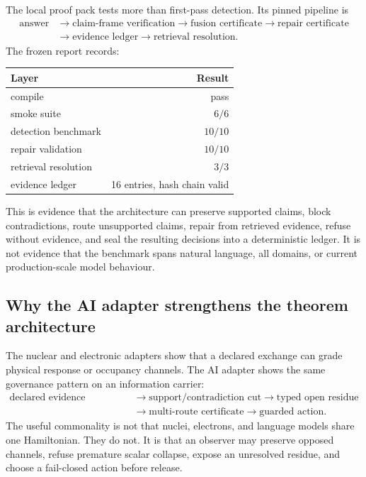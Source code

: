 The local proof pack tests more than first-pass detection. Its pinned pipeline is
\[
\begin{aligned}
\text{answer}
&\to\text{claim-frame verification}
\to\text{fusion certificate}
\to\text{repair certificate}\\
&\to\text{evidence ledger}
\to\text{retrieval resolution}.
\end{aligned}
\]
The frozen report records:
\begin{center}
\begin{tabular}{lr}
\toprule
Layer & Result\\
\midrule
compile & pass\\
smoke suite & $6/6$\\
detection benchmark & $10/10$\\
repair validation & $10/10$\\
retrieval resolution & $3/3$\\
evidence ledger & 16 entries, hash chain valid\\
\bottomrule
\end{tabular}
\end{center}
This is evidence that the architecture can preserve supported claims, block contradictions, route unsupported claims, repair from retrieved evidence, refuse without evidence, and seal the resulting decisions into a deterministic ledger. It is not evidence that the benchmark spans natural language, all domains, or current production-scale model behaviour.

\subsection{Why the AI adapter strengthens the theorem architecture}

The nuclear and electronic adapters show that a declared exchange can grade physical response or occupancy channels. The AI adapter shows the same governance pattern on an information carrier:
\[
\begin{aligned}
\text{declared evidence channels}
&\to\text{support/contradiction cut}
\to\text{typed open residue}\\
&\to\text{multi-route certificate}
\to\text{guarded action}.
\end{aligned}
\]
The useful commonality is not that nuclei, electrons, and language models share one Hamiltonian. They do not. It is that an observer may preserve opposed channels, refuse premature scalar collapse, expose an unresolved residue, and choose a fail-closed action before release.

